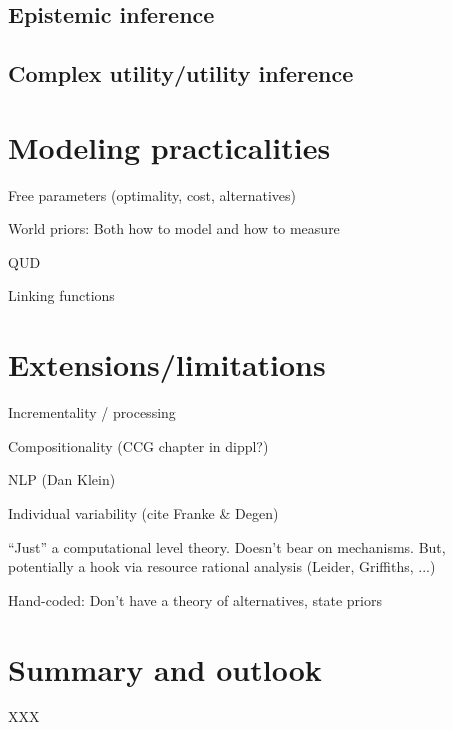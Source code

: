 \documentclass{sp}
\begin{document}
\subsection{Epistemic inference}

\subsection{Complex utility/utility inference}

\section{Modeling practicalities} \label{practicalities}

Free parameters (optimality, cost, alternatives)

World priors: Both how to model and how to measure

QUD

Linking functions


\section{Extensions/limitations} \label{limitations}

Incrementality / processing

Compositionality (CCG chapter in dippl?)

NLP (Dan Klein)

Individual variability (cite Franke \& Degen)

``Just'' a computational level theory. Doesn't bear on mechanisms. But, potentially a hook via resource rational analysis (Leider, Griffiths, ...)

Hand-coded: Don't have a theory of alternatives, state priors

\section{Summary and outlook} \label{summary}

XXX




\end{document}
